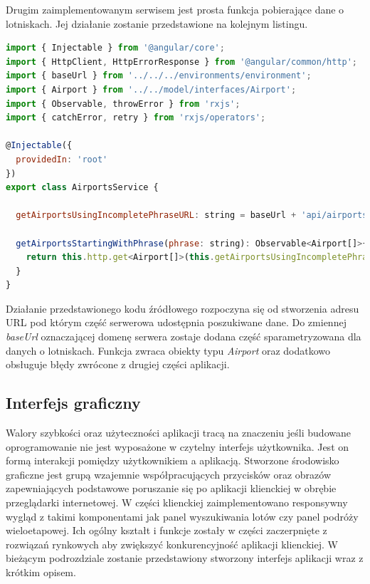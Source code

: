 \documentclass[12pt, twoside]{report}
\begin{document}
Drugim zaimplementowanym serwisem jest prosta funkcja pobierające dane o lotniskach. Jej działanie zostanie przedstawione na kolejnym listingu.
\begin{lstlisting}[language=JavaScript, caption= Kod źródłowy funkcji pobierającej dane lotnisk]
import { Injectable } from '@angular/core';
import { HttpClient, HttpErrorResponse } from '@angular/common/http';
import { baseUrl } from '../../../environments/environment';
import { Airport } from '../../model/interfaces/Airport';
import { Observable, throwError } from 'rxjs';
import { catchError, retry } from 'rxjs/operators';

@Injectable({
  providedIn: 'root'
})
export class AirportsService {

  getAirportsUsingIncompletePhraseURL: string = baseUrl + 'api/airports/getAirportsStartingWith/';

  getAirportsStartingWithPhrase(phrase: string): Observable<Airport[]>{
    return this.http.get<Airport[]>(this.getAirportsUsingIncompletePhraseURL + phrase).pipe(catchError(this.handleError)); 
  }  
}
\end{lstlisting}
Działanie przedstawionego kodu źródłowego rozpoczyna się od stworzenia adresu URL pod którym część serwerowa udostępnia poszukiwane dane. Do zmiennej \textit{baseUrl} oznaczającej domenę serwera zostaje dodana część sparametryzowana dla danych o lotniskach. Funkcja zwraca obiekty typu \textit{Airport} oraz dodatkowo obsługuje błędy zwrócone z drugiej części aplikacji.
\subsection{Interfejs graficzny}
Walory szybkości oraz użyteczności aplikacji tracą na znaczeniu jeśli budowane oprogramowanie nie jest wyposażone w czytelny interfejs użytkownika. Jest on formą interakcji pomiędzy użytkownikiem a aplikacją. Stworzone środowisko graficzne jest grupą wzajemnie współpracujących przycisków oraz obrazów zapewniających podstawowe poruszanie się po aplikacji klienckiej w obrębie przeglądarki internetowej. 
W części klienckiej zaimplementowano responsywny wygląd z takimi komponentami jak panel wyszukiwania lotów czy panel podróży wieloetapowej. Ich ogólny kształt i funkcje zostały w części zaczerpnięte z rozwiązań rynkowych aby zwiększyć konkurencyjność aplikacji klienckiej. 
\newpage
W bieżącym podrozdziale zostanie przedstawiony stworzony interfejs aplikacji wraz z krótkim opisem.
\end{document}
